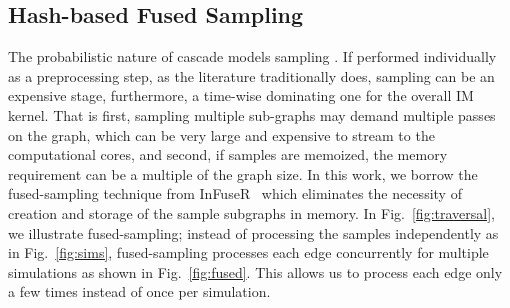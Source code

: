 \subsection{Hash-based Fused Sampling}
The probabilistic nature of cascade models  sampling . If performed individually as a preprocessing step, as the literature traditionally does, sampling can be an expensive stage, furthermore, a time-wise dominating one for the overall IM kernel. That is first, sampling multiple sub-graphs may demand multiple passes on the graph, which can be very large and expensive to stream to the computational cores, and second, if samples are memoized, the memory requirement can be a multiple of the graph size. 
In this work, we borrow the fused-sampling technique from {\sc InFuseR}~\cite{infuser} which eliminates the necessity of creation and storage of the sample subgraphs in memory. 
In Fig.~\ref{fig:traversal}, we illustrate fused-sampling; instead of processing the samples independently as in Fig.~\ref{fig:sims}, fused-sampling processes each edge concurrently for multiple simulations as shown in Fig.~\ref{fig:fused}. This allows us to process each edge only a few times instead of once per simulation.


